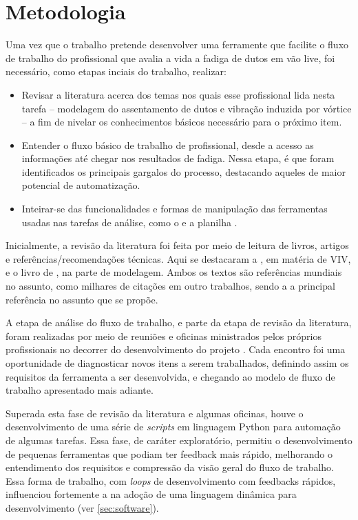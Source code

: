 \chapter{Metodologia}\label{chap:metodologia}


Uma vez que o trabalho pretende desenvolver uma ferramente que facilite o fluxo de trabalho do profissional que avalia a vida a fadiga de dutos em vão live, foi necessário, como etapas inciais do trabalho, realizar:

\begin{itemize}
    \item Revisar a literatura acerca dos temas nos quais esse profissional lida nesta tarefa -- modelagem do assentamento de dutos e vibração induzida por vórtice -- a fim de nivelar os conhecimentos básicos necessário para o próximo item.
    \item Entender o fluxo básico de trabalho de profissional, desde a acesso as informações até chegar nos resultados de fadiga. Nessa etapa, é que foram identificados os principais gargalos do processo, destacando aqueles de maior potencial de automatização.
    \item Inteirar-se das funcionalidades e formas de manipulação das ferramentas usadas nas tarefas de análise, como o \abaqus e a planilha \fatfree.
\end{itemize}

Inicialmente, a revisão da literatura foi feita por meio de leitura de livros, artigos e referências/recomendações técnicas.
Aqui se destacaram a , em matéria de VIV, e o livro de , na parte de modelagem.
Ambos os textos são referências mundiais no assunto, como milhares de citações em outro trabalhos, sendo a  a principal referência no assunto que se propõe.

A etapa de análise do fluxo de trabalho, e parte da etapa de revisão da literatura, foram realizadas por meio de reuniões e oficinas ministrados pelos próprios profissionais no decorrer do desenvolvimento do projeto \integrispan.
Cada encontro foi uma oportunidade de diagnosticar novos itens a serem trabalhados, definindo assim os requisitos da ferramenta a ser desenvolvida, e chegando ao modelo de fluxo de trabalho apresentado mais adiante.

Superada esta fase de revisão da literatura e algumas oficinas, houve o desenvolvimento de uma série de \textit{scripts} em linguagem Python para automação de algumas tarefas.
Essa fase, de caráter exploratório, permitiu o desenvolvimento de pequenas ferramentas que podiam ter feedback mais rápido, melhorando o entendimento dos requisitos e compressão da visão geral do fluxo de trabalho.
Essa forma de trabalho, com \textit{loops} de desenvolvimento com feedbacks rápidos, influenciou fortemente a na adoção de uma linguagem dinâmica para desenvolvimento (ver \autoref{sec:software}).

